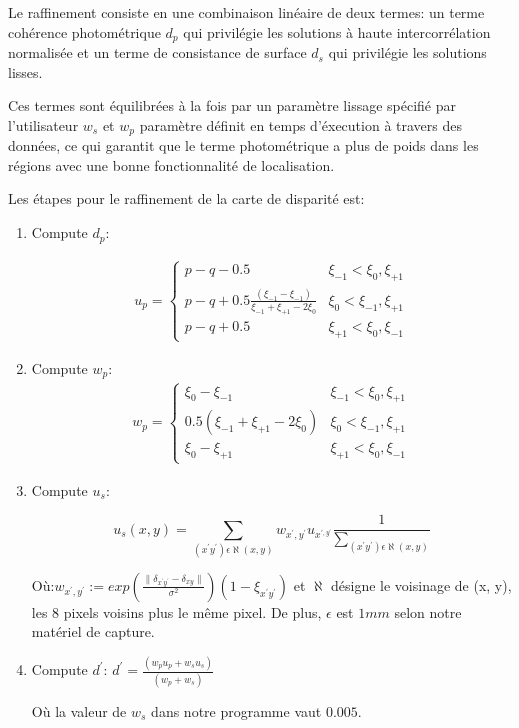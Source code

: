\documentclass[a4paper,12pt]{article}
\begin{document}
Le raffinement consiste en une combinaison linéaire de deux termes: un
terme cohérence photométrique $d_p$ qui privilégie les solutions à
haute intercorrélation normalisée et un terme de consistance de
surface $d_s$ qui privilégie les solutions lisses.

Ces termes sont équilibrées à la fois par un paramètre lissage
spécifié par l'utilisateur $w_s$ et $w_p$ paramètre définit en temps
d'éxecution à travers des données, ce qui garantit que le terme
photométrique a plus de poids dans les régions avec une bonne
fonctionnalité de localisation.

Les étapes pour le raffinement de la carte de disparité est:
\begin{enumerate}
\item Compute $d_p$:

\begin{eqnarray*}
u_{p}=\begin{cases}
p - q - 0.5 & \xi_{-1}<\xi_{0},\xi_{+1}\\
p - q + 0.5\frac{(\xi_{-1}-\xi_{-1})}{\xi_{-1}+\xi_{+1}-2\xi_{0}} &
\xi_{0}<\xi_{-1},\xi_{+1}\\ 
p - q + 0.5 & \xi_{+1}<\xi_{0},\xi_{-1}
\end{cases}
\end{eqnarray*}

\item Compute $w_p$:
\begin{eqnarray*}
w_{p}=\begin{cases}
\xi_{0}-\xi_{-1} & \xi_{-1}<\xi_{0},\xi_{+1}\\
0.5(\xi_{-1}+\xi_{+1}-2\xi_{0}) & \xi_{0}<\xi_{-1},\xi_{+1}\\
\xi_{0}-\xi_{+1} & \xi_{+1}<\xi_{0},\xi_{-1}
\end{cases}
\end{eqnarray*}

\item Compute $u_s$:

\[
u_{s}(x,y)=\sum_{(x^{'}y^{'})\epsilon\aleph(x,y)}w_{x^{'},y^{'}}u_{x^{',y^{'}}}\frac{1}{\sum_{(x^{'}y^{'})\epsilon\aleph(x,y)}} 
\]

Où:$w_{x^{'},y^{'}}:=exp\left(\frac{\parallel\delta_{x^{'}y^{'}}-\delta_{xy}\parallel}{\sigma^{2}}\right)(1-\xi_{x^{'}y^{'}})$
et $\aleph$ désigne le voisinage de (x, y), les 8 pixels voisins plus
le même pixel. De plus, $\epsilon$ est $1mm$ selon notre matériel de
capture. 

\item Compute $d^{'}$:
$d^{'}=\frac{(w_{p}u_{p}+w_{s}u_{s})}{(w_{p}+w_{s})}$

Où la valeur de $w_{s}$ dans notre programme vaut $0.005$.

\end{enumerate}
\end{document}
